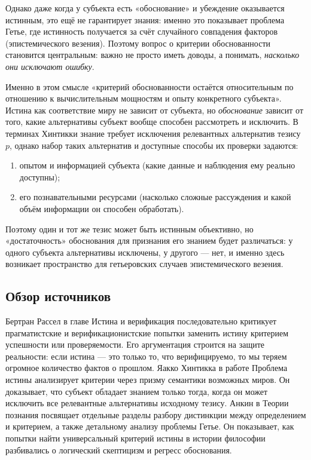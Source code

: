 \documentclass[a4paper,12pt]{article}
\begin{document}
Однако даже когда у субъекта есть «обоснование» и убеждение оказывается истинным, это ещё не гарантирует знания: именно это показывает проблема Гетье, где истинность получается за счёт случайного совпадения факторов (эпистемического везения). Поэтому вопрос о критерии обоснованности становится центральным: важно не просто иметь доводы, а понимать, \emph{насколько они исключают ошибку}.

Именно в этом смысле «критерий обоснованности остаётся относительным по отношению к вычислительным мощностям и опыту конкретного субъекта». Истина как соответствие миру не зависит от субъекта, но \emph{обоснование} зависит от того, какие альтернативы субъект вообще способен рассмотреть и исключить. В терминах Хинтикки знание требует исключения релевантных альтернатив тезису $p$, однако набор таких альтернатив и доступные способы их проверки задаются: \begin{enumerate}
    \item опытом и информацией субъекта (какие данные и наблюдения ему реально доступны);
    \item его познавательными ресурсами (насколько сложные рассуждения и какой объём информации он способен обработать).
\end{enumerate}
Поэтому один и тот же тезис может быть истинным объективно, но «достаточность» обоснования для признания его знанием будет различаться: у одного субъекта альтернативы исключены, у другого — нет, и именно здесь возникает пространство для гетьеровских случаев эпистемического везения.

\subsection{Обзор источников}
Бертран Рассел в главе Истина и верификация последовательно критикует прагматистские и верификационистские попытки заменить истину критерием успешности или проверяемости. Его аргументация строится на защите реальности: если истина — это только то, что верифицируемо, то мы теряем огромное количество фактов о прошлом. Яакко Хинтикка в работе Проблема истины анализирует критерии через призму семантики возможных миров. Он доказывает, что субъект обладает знанием только тогда, когда он может исключить все релевантные альтернативы исходному тезису. Анкин в Теории познания посвящает отдельные разделы разбору дистинкции между определением и критерием, а также детальному анализу проблемы Гетье. Он показывает, как попытки найти универсальный критерий истины в истории философии разбивались о логический скептицизм и регресс обоснования.
\end{document}
